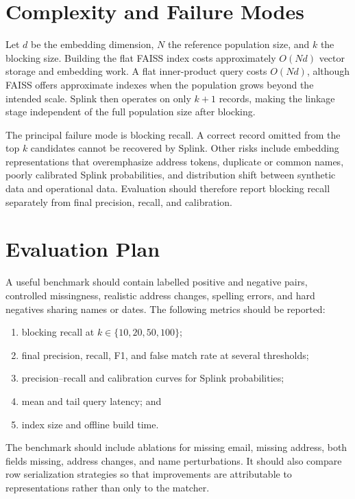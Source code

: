 \documentclass[11pt]{article}
\begin{document}
\section{Complexity and Failure Modes}
Let $d$ be the embedding dimension, $N$ the reference population size, and $k$ the blocking size. Building the flat FAISS index costs approximately $O(Nd)$ vector storage and embedding work. A flat inner-product query costs $O(Nd)$, although FAISS offers approximate indexes when the population grows beyond the intended scale. Splink then operates on only $k+1$ records, making the linkage stage independent of the full population size after blocking.

The principal failure mode is blocking recall. A correct record omitted from the top $k$ candidates cannot be recovered by Splink. Other risks include embedding representations that overemphasize address tokens, duplicate or common names, poorly calibrated Splink probabilities, and distribution shift between synthetic data and operational data. Evaluation should therefore report blocking recall separately from final precision, recall, and calibration.

\section{Evaluation Plan}
A useful benchmark should contain labelled positive and negative pairs, controlled missingness, realistic address changes, spelling errors, and hard negatives sharing names or dates. The following metrics should be reported:
\begin{enumerate}[leftmargin=*]
  \item blocking recall at $k \in \{10,20,50,100\}$;
  \item final precision, recall, F1, and false match rate at several thresholds;
  \item precision--recall and calibration curves for Splink probabilities;
  \item mean and tail query latency; and
  \item index size and offline build time.
\end{enumerate}

The benchmark should include ablations for missing email, missing address, both fields missing, address changes, and name perturbations. It should also compare row serialization strategies so that improvements are attributable to representations rather than only to the matcher.
\end{document}

